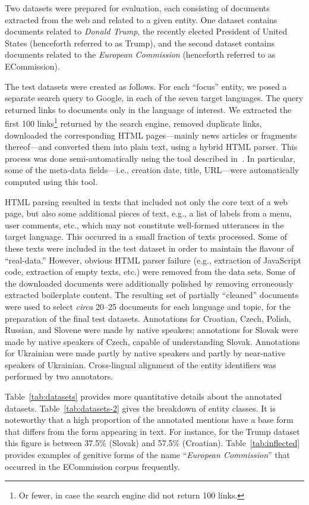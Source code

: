 \documentclass[11pt]{article}
\begin{document}
Two datasets were prepared for evaluation, each consisting of documents extracted from the web
and related to a given entity.  One dataset contains documents related to {\em Donald Trump}, the
recently elected President of United States (henceforth referred to as {\sc Trump}), and the
second dataset contains documents related to the {\em European Commission} (henceforth referred to
as {\sc ECommission}).

The test datasets were created as follows.  For each ``focus'' entity, we posed a separate
search query to Google, in each of the seven target languages.  The query returned links to
documents only in the language of interest.  We extracted the first 100 links\footnote{Or
  fewer, in case the search engine did not return 100 links.} returned by the search engine,
removed duplicate links, downloaded the corresponding HTML pages---mainly news articles or
fragments thereof---and converted them into plain text, using a hybrid HTML parser.  This
process was done semi-automatically using the tool described in~\cite{Crawley:ea:2010}.  In
particular, some of the meta-data fields---i.e., creation date, title, URL---were automatically
computed using this tool.

HTML parsing resulted in texts that included not only the core text of a web page, but also
some additional pieces of text, e.g., a list of labels from a menu, user comments, etc., which
may not constitute well-formed utterances in the target language.  This occurred in a small
fraction of texts processed.  Some of these texts were included in the test dataset in order
to maintain the flavour of ``real-data.''  However, obvious HTML parser failure (e.g.,
extraction of JavaScript code, extraction of empty texts, etc.) were removed from the data
sets.  Some of the downloaded documents were additionally polished by removing erroneously
extracted boilerplate content.  The resulting set of partially ``cleaned'' documents were used
to select {\em circa} 20--25 documents for each language and topic, for the preparation of the
final test datasets.  Annotations for Croatian, Czech, Polish, Russian, and Slovene were made
by native speakers; annotations for Slovak were made by native speakers of Czech, capable of
understanding Slovak.  Annotations for Ukrainian were made partly by native speakers and
partly by near-native speakers of Ukrainian.  Cross-lingual alignment of the entity
identifiers was performed by two annotators.



Table~\ref{tab:datasets} provides more quantitative details about the annotated datasets.
Table~\ref{tab:datasets-2} gives the breakdown of entity classes.  It is noteworthy that a
high proportion of the annotated mentions have a base form that differs from the form
appearing in text.  For instance, for the {\sc Trump} dataset this figure is between 37.5\%
(Slovak) and 57.5\% (Croatian). Table~\ref{tab:inflected} provides examples of genitive forms 
of the name ``\textit{European Commission}'' that occurred in the {\sc ECommission} corpus frequently.
\end{document}

